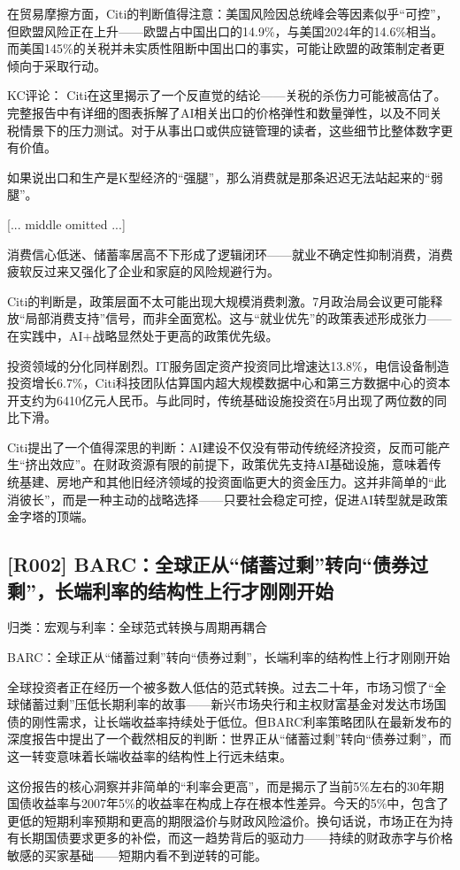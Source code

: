 \documentclass[11pt]{ctexart}
\begin{document}
在贸易摩擦方面，Citi的判断值得注意：美国风险因总统峰会等因素似乎“可控”，但欧盟风险正在上升——欧盟占中国出口的14.9\%，与美国2024年的14.6\%相当。而美国145\%的关税并未实质性阻断中国出口的事实，可能让欧盟的政策制定者更倾向于采取行动。

KC评论： Citi在这里揭示了一个反直觉的结论——关税的杀伤力可能被高估了。完整报告中有详细的图表拆解了AI相关出口的价格弹性和数量弹性，以及不同关税情景下的压力测试。对于从事出口或供应链管理的读者，这些细节比整体数字更有价值。

如果说出口和生产是K型经济的“强腿”，那么消费就是那条迟迟无法站起来的“弱腿”。

[... middle omitted ...]

消费信心低迷、储蓄率居高不下形成了逻辑闭环——就业不确定性抑制消费，消费疲软反过来又强化了企业和家庭的风险规避行为。

Citi的判断是，政策层面不太可能出现大规模消费刺激。7月政治局会议更可能释放“局部消费支持”信号，而非全面宽松。这与“就业优先”的政策表述形成张力——在实践中，AI+战略显然处于更高的政策优先级。

投资领域的分化同样剧烈。IT服务固定资产投资同比增速达13.8\%，电信设备制造投资增长6.7\%，Citi科技团队估算国内超大规模数据中心和第三方数据中心的资本开支约为6410亿元人民币。与此同时，传统基础设施投资在5月出现了两位数的同比下滑。

Citi提出了一个值得深思的判断：AI建设不仅没有带动传统经济投资，反而可能产生“挤出效应”。在财政资源有限的前提下，政策优先支持AI基础设施，意味着传统基建、房地产和其他旧经济领域的投资面临更大的资金压力。这并非简单的“此消彼长”，而是一种主动的战略选择——只要社会稳定可控，促进AI转型就是政策金字塔的顶端。

\subsection{[R002] BARC：全球正从“储蓄过剩”转向“债券过剩”，长端利率的结构性上行才刚刚开始}
{\small\color{refgray}归类：宏观与利率：全球范式转换与周期再耦合}

BARC：全球正从“储蓄过剩”转向“债券过剩”，长端利率的结构性上行才刚刚开始

全球投资者正在经历一个被多数人低估的范式转换。过去二十年，市场习惯了“全球储蓄过剩”压低长期利率的故事——新兴市场央行和主权财富基金对发达市场国债的刚性需求，让长端收益率持续处于低位。但BARC利率策略团队在最新发布的深度报告中提出了一个截然相反的判断：世界正从“储蓄过剩”转向“债券过剩”，而这一转变意味着长端收益率的结构性上行远未结束。

这份报告的核心洞察并非简单的“利率会更高”，而是揭示了当前5\%左右的30年期国债收益率与2007年5\%的收益率在构成上存在根本性差异。今天的5\%中，包含了更低的短期利率预期和更高的期限溢价与财政风险溢价。换句话说，市场正在为持有长期国债要求更多的补偿，而这一趋势背后的驱动力——持续的财政赤字与价格敏感的买家基础——短期内看不到逆转的可能。
\end{document}
